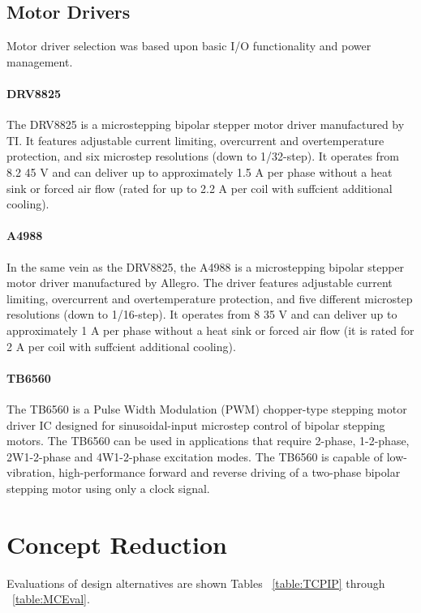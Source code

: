 \subsection{Motor Drivers}
Motor driver selection was based upon basic I/O functionality and power management.

\paragraph{DRV8825}
The DRV8825 is a microstepping bipolar stepper motor driver manufactured by TI.
It features adjustable current limiting, overcurrent and overtemperature protection, and six microstep resolutions (down to 1/32-step).
It operates from 8.2 45 V and can deliver up to approximately 1.5 A per phase without a heat sink or forced air ﬂow (rated for up to 2.2 A per coil with suffcient additional cooling).

\paragraph{A4988}
In the same vein as the DRV8825, the A4988 is a microstepping bipolar stepper motor driver manufactured by Allegro.
The driver features adjustable current limiting, overcurrent and overtemperature protection, and five different microstep resolutions (down to 1/16-step).
It operates from 8 35 V and can deliver up to approximately 1 A per phase without a heat sink or forced air ﬂow (it is rated for 2 A per coil with suffcient additional cooling).

\paragraph{TB6560}
The TB6560 is a Pulse Width Modulation (PWM) chopper-type stepping motor driver IC designed for sinusoidal-input microstep control of bipolar stepping motors.
The TB6560 can be used in applications that require 2-phase, 1-2-phase, 2W1-2-phase and 4W1-2-phase excitation modes.
The TB6560 is capable of low-vibration, high-performance forward and reverse driving of a two-phase bipolar stepping motor using only a clock signal.

\section{Concept Reduction}

Evaluations of design alternatives are shown Tables ~\ref{table:TCPIP} through ~\ref{table:MCEval}.


